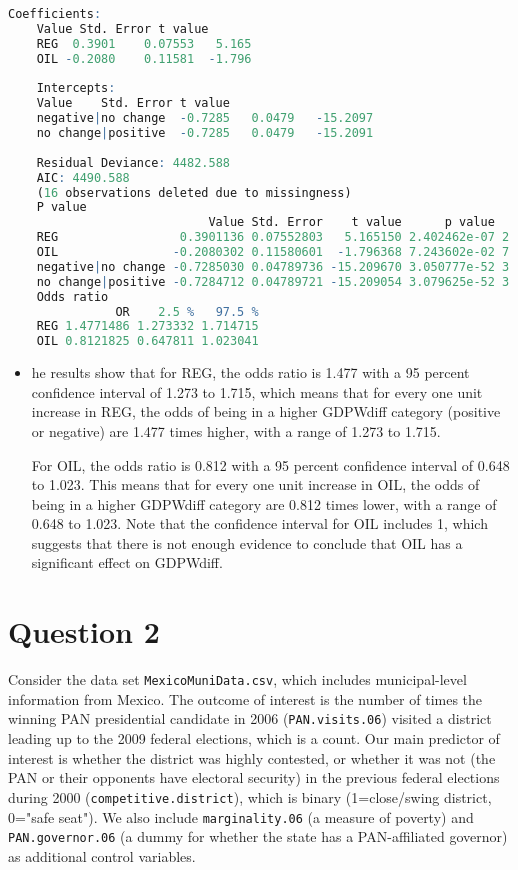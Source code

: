 \documentclass[12pt,letterpaper]{article}
\begin{document}
\begin{enumerate}
\begin{lstlisting}[language=R]
	Coefficients:
	Value Std. Error t value
	REG  0.3901    0.07553   5.165
	OIL -0.2080    0.11581  -1.796
	
	Intercepts:
	Value    Std. Error t value 
	negative|no change  -0.7285   0.0479   -15.2097
	no change|positive  -0.7285   0.0479   -15.2091
	
	Residual Deviance: 4482.588 
	AIC: 4490.588 
	(16 observations deleted due to missingness)
	P value
	                        Value Std. Error    t value      p value      p value
	REG                 0.3901136 0.07552803   5.165150 2.402462e-07 2.402462e-07
	OIL                -0.2080302 0.11580601  -1.796368 7.243602e-02 7.243602e-02
	negative|no change -0.7285030 0.04789736 -15.209670 3.050777e-52 3.050777e-52
	no change|positive -0.7284712 0.04789721 -15.209054 3.079625e-52 3.079625e-52
	Odds ratio
	           OR    2.5 %   97.5 %
	REG 1.4771486 1.273332 1.714715
	OIL 0.8121825 0.647811 1.023041
\end{lstlisting}
\begin{itemize}
	\item he results show that for REG, the odds ratio is 1.477 with a 95 percent  confidence interval of 1.273 to 1.715, which means that for every one unit increase in REG, the odds of being in a higher GDPWdiff category (positive or negative) are 1.477 times higher, with a range of 1.273 to 1.715.
	
	For OIL, the odds ratio is 0.812 with a 95 percent confidence interval of 0.648 to 1.023. This means that for every one unit increase in OIL, the odds of being in a higher GDPWdiff category are 0.812 times lower, with a range of 0.648 to 1.023. Note that the confidence interval for OIL includes 1, which suggests that there is not enough evidence to conclude that OIL has a significant effect on GDPWdiff.
\end{itemize}
\end{enumerate}

\section*{Question 2} 
\vspace{.25cm}

\noindent Consider the data set \texttt{MexicoMuniData.csv}, which includes municipal-level information from Mexico. The outcome of interest is the number of times the winning PAN presidential candidate in 2006 (\texttt{PAN.visits.06}) visited a district leading up to the 2009 federal elections, which is a count. Our main predictor of interest is whether the district was highly contested, or whether it was not (the PAN or their opponents have electoral security) in the previous federal elections during 2000 (\texttt{competitive.district}), which is binary (1=close/swing district, 0="safe seat"). We also include \texttt{marginality.06} (a measure of poverty) and \texttt{PAN.governor.06} (a dummy for whether the state has a PAN-affiliated governor) as additional control variables. 
\end{document}
